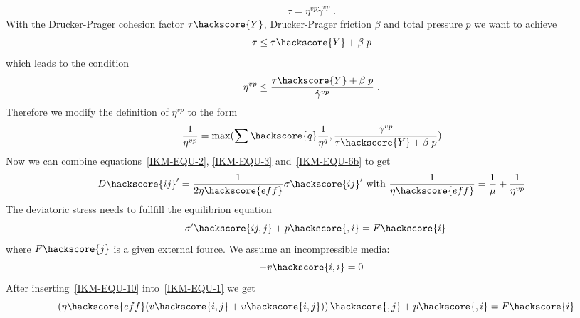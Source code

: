\begin{equation}\label{IKM-EQU-8b}
\tau = \eta^{vp} \dot{\gamma}^{vp} \;.
\end{equation}
With the Drucker-Prager cohesion factor $\tau\hackscore{Y}$, Drucker-Prager friction $\beta$ and total pressure $p$ we want to achieve 
\begin{equation}\label{IKM-EQU-8c}
\tau \le \tau\hackscore{Y} + \beta \; p
\end{equation}
which leads to the condition
\begin{equation}\label{IKM-EQU-8d}
\eta^{vp} \le \frac{\tau\hackscore{Y} + \beta \; p}{ \dot{\gamma}^{vp}} \; .
\end{equation}
Therefore we modify the definition of $\eta^{vp}$ to the form
\begin{equation}\label{IKM-EQU-6b}
\frac{1}{\eta^{vp}}=\max(\sum\hackscore{q} \frac{1}{\eta^{q}}, \frac{\dot{\gamma}^{vp}} {\tau\hackscore{Y} + \beta \; p})
\end{equation}
Now we can combine equations~\ref{IKM-EQU-2}, \ref{IKM-EQU-3} and~\ref{IKM-EQU-6b} to get
\begin{equation}\label{IKM-EQU-10}
D\hackscore{ij}'=\frac{1}{2 \eta\hackscore{eff}} \sigma\hackscore{ij}' \mbox{ with }
\frac{1}{\eta\hackscore{eff}}=\frac{1}{\mu}+\frac{1}{\eta^{vp}}
\end{equation}
The deviatoric stress needs to fullfill the equilibrion equation
\begin{equation}\label{IKM-EQU-1}
-\sigma'\hackscore{ij,j}+p\hackscore{,i}=F\hackscore{i}
\end{equation}
where $F\hackscore{j}$ is a given external fource. We assume an incompressible media:
\begin{equation}\label{IKM-EQU-2}
-v\hackscore{i,i}=0
\end{equation}
After inserting~\ref{IKM-EQU-10} into~\ref{IKM-EQU-1} we get
\begin{equation}\label{IKM-EQU-1ib}
-\left(\eta\hackscore{eff} (v\hackscore{i,j}+ v\hackscore{i,j})\right)\hackscore{,j}+p\hackscore{,i}=F\hackscore{i}
\end{equation}

